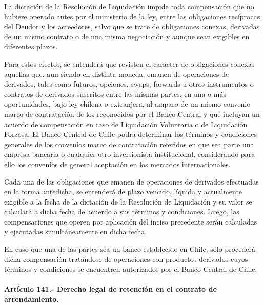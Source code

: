 \documentclass[
]{book}
\begin{document}
La dictación de la Resolución de Liquidación impide toda compensación que no hubiere operado antes por el ministerio de la ley, entre las obligaciones recíprocas del Deudor y los acreedores, salvo que se trate de obligaciones conexas, derivadas de un mismo contrato o de una misma negociación y aunque sean exigibles en diferentes plazos.

Para estos efectos, se entenderá que revisten el carácter de obligaciones conexas aquellas que, aun siendo en distinta moneda, emanen de operaciones de derivados, tales como futuros, opciones, swaps, forwards u otros instrumentos o contratos de derivados suscritos entre las mismas partes, en una o más oportunidades, bajo ley chilena o extranjera, al amparo de un mismo convenio marco de contratación de los reconocidos por el Banco Central y que incluyan un acuerdo de compensación en caso de Liquidación Voluntaria o de Liquidación Forzosa. El Banco Central de Chile podrá determinar los términos y condiciones generales de los convenios marco de contratación referidos en que sea parte una empresa bancaria o cualquier otro inversionista institucional, considerando para ello los convenios de general aceptación en los mercados internacionales.

Cada una de las obligaciones que emanen de operaciones de derivados efectuadas en la forma antedicha, se entenderá de plazo vencido, líquida y actualmente exigible a la fecha de la dictación de la Resolución de Liquidación y su valor se calculará a dicha fecha de acuerdo a sus términos y condiciones. Luego, las compensaciones que operen por aplicación del inciso precedente serán calculadas y ejecutadas simultáneamente en dicha fecha.

En caso que una de las partes sea un banco establecido en Chile, sólo procederá dicha compensación tratándose de operaciones con productos derivados cuyos términos y condiciones se encuentren autorizados por el Banco Central de Chile.

\hypertarget{artuxedculo-141.--derecho-legal-de-retenciuxf3n-en-el-contrato-de-arrendamiento.}{%
\paragraph*{Artículo 141.- Derecho legal de retención en el contrato de arrendamiento.}\label{artuxedculo-141.--derecho-legal-de-retenciuxf3n-en-el-contrato-de-arrendamiento.}}
\end{document}
